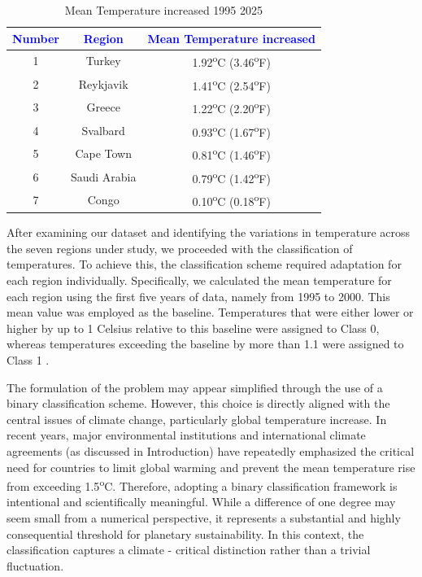 \documentclass[12pt]{Definitions/academia}
\begin{document}
\begin{table}[H]
		\centering
\begin{tabular}{|c|c|c|}
\hline
\textbf{\textcolor{blue}{Number}} & \textbf{\textcolor{blue}{Region}} & \textbf{\textcolor{blue}{Mean Temperature increased}}\tabularnewline
\hline
\hline
1 & Turkey & 1.92\textsuperscript{o}C (3.46\textsuperscript{o}F)\tabularnewline
\hline
2 & Reykjavik & 1.41\textsuperscript{o}C (2.54\textsuperscript{o}F)\tabularnewline
\hline
3 & Greece & 1.22\textsuperscript{o}C (2.20\textsuperscript{o}F)\tabularnewline
\hline
4 & Svalbard & 0.93\textsuperscript{o}C (1.67\textsuperscript{o}F)\tabularnewline
\hline
5 & Cape Town & 0.81\textsuperscript{o}C (1.46\textsuperscript{o}F)\tabularnewline
\hline
6 & Saudi Arabia & 0.79\textsuperscript{o}C (1.42\textsuperscript{o}F)\tabularnewline
\hline
7 & Congo & 0.10\textsuperscript{o}C (0.18\textsuperscript{o}F)\tabularnewline
\hline
\end{tabular}

\caption{Mean Temperature increased 1995 2025\label{tab:Table-3-Mean-Temperature-increased-1995-2025}}

\end{table}

After examining our dataset and identifying the variations in temperature
across the seven regions under study, we proceeded with the classification
of temperatures. To achieve this, the classification scheme required
adaptation for each region individually. Specifically, we calculated
the mean temperature for each region using the first five years of
data, namely from 1995 to 2000. This mean value was employed as the
baseline. Temperatures that were either lower or higher by up to 1 Celsius
relative to this baseline were assigned to Class 0,
whereas temperatures exceeding the baseline by more than 1.1 
were assigned to Class 1 .

 {The formulation of the problem may appear simplified through the use of a binary classification scheme. However, this choice is directly aligned with the central issues of climate change, particularly global temperature increase. In recent years, major environmental institutions and international climate agreements (as discussed in  Introduction) have repeatedly emphasized the critical need for countries to limit global warming and prevent the mean temperature rise from exceeding 1.5\textsuperscript{o}C.}
{Therefore, adopting a binary classification framework is intentional and scientifically meaningful. While a difference of one degree may seem small from a numerical perspective, it represents a substantial and highly consequential threshold for planetary sustainability. In this context, the classification captures a climate - critical distinction rather than a trivial fluctuation.}
\end{document}
